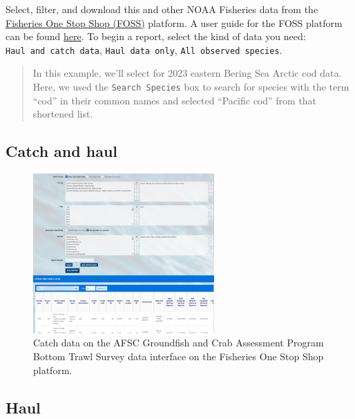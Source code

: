 \documentclass[
  letterpaper,
  oneside,
  open=any]{scrbook}
\begin{document}
Select, filter, and download this and other NOAA Fisheries data from the
\href{https://www.fisheries.noaa.gov/foss}{Fisheries One Stop Shop
(FOSS)} platform. A user guide for the FOSS platform can be found
\href{https://www.fisheries.noaa.gov/foss/f?p=215:7:7542600605674:::::}{here}.
To begin a report, select the kind of data you need:
\texttt{Haul\ and\ catch\ data}, \texttt{Haul\ data\ only},
\texttt{All\ observed\ species}.

\begin{quote}
In this example, we'll select for 2023 eastern Bering Sea Arctic cod
data. Here, we used the \texttt{Search\ Species} box to search for
species with the term ``cod'' in their common names and selected
``Pacific cod'' from that shortened list.
\end{quote}

\hypertarget{catch-and-haul}{%
\subsection{Catch and haul}\label{catch-and-haul}}

\begin{figure}

{\centering \includegraphics[width=2.73in,height=\textheight]{content/../img/foss_1_interface_catch.png}

}

\caption{Catch data on the AFSC Groundfish and Crab Assessment Program
Bottom Trawl Survey data interface on the Fisheries One Stop Shop
platform.}

\end{figure}

\hypertarget{haul}{%
\subsection{Haul}\label{haul}}
\end{document}

